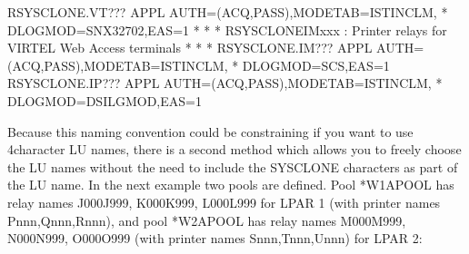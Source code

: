 \documentclass[letterpaper,10pt,english]{sphinxmanual}
\begin{document}
\begin{sphinxVerbatim}[commandchars=\\\{\}]
R\PYGZam{}SYSCLONE.VT??? APPL AUTH=(ACQ,PASS),MODETAB=ISTINCLM,               *
      DLOGMOD=SNX32702,EAS=1
* \PYGZhy{}\PYGZhy{}\PYGZhy{}\PYGZhy{}\PYGZhy{}\PYGZhy{}\PYGZhy{}\PYGZhy{}\PYGZhy{}\PYGZhy{}\PYGZhy{}\PYGZhy{}\PYGZhy{}\PYGZhy{}\PYGZhy{}\PYGZhy{}\PYGZhy{}\PYGZhy{}\PYGZhy{}\PYGZhy{}\PYGZhy{}\PYGZhy{}\PYGZhy{}\PYGZhy{}\PYGZhy{}\PYGZhy{}\PYGZhy{}\PYGZhy{}\PYGZhy{}\PYGZhy{}\PYGZhy{}\PYGZhy{}\PYGZhy{}\PYGZhy{}\PYGZhy{}\PYGZhy{}\PYGZhy{}\PYGZhy{}\PYGZhy{}\PYGZhy{}\PYGZhy{}\PYGZhy{}\PYGZhy{}\PYGZhy{}\PYGZhy{}\PYGZhy{}\PYGZhy{}\PYGZhy{}\PYGZhy{}\PYGZhy{}\PYGZhy{}\PYGZhy{}\PYGZhy{}\PYGZhy{}\PYGZhy{}\PYGZhy{}\PYGZhy{}\PYGZhy{}\PYGZhy{}\PYGZhy{}\PYGZhy{}\PYGZhy{}\PYGZhy{}\PYGZhy{}\PYGZhy{}\PYGZhy{} *
* R\PYGZam{}SYSCLONEIMxxx : Printer relays for VIRTEL Web Access terminals   *
* \PYGZhy{}\PYGZhy{}\PYGZhy{}\PYGZhy{}\PYGZhy{}\PYGZhy{}\PYGZhy{}\PYGZhy{}\PYGZhy{}\PYGZhy{}\PYGZhy{}\PYGZhy{}\PYGZhy{}\PYGZhy{}\PYGZhy{}\PYGZhy{}\PYGZhy{}\PYGZhy{}\PYGZhy{}\PYGZhy{}\PYGZhy{}\PYGZhy{}\PYGZhy{}\PYGZhy{}\PYGZhy{}\PYGZhy{}\PYGZhy{}\PYGZhy{}\PYGZhy{}\PYGZhy{}\PYGZhy{}\PYGZhy{}\PYGZhy{}\PYGZhy{}\PYGZhy{}\PYGZhy{}\PYGZhy{}\PYGZhy{}\PYGZhy{}\PYGZhy{}\PYGZhy{}\PYGZhy{}\PYGZhy{}\PYGZhy{}\PYGZhy{}\PYGZhy{}\PYGZhy{}\PYGZhy{}\PYGZhy{}\PYGZhy{}\PYGZhy{}\PYGZhy{}\PYGZhy{}\PYGZhy{}\PYGZhy{}\PYGZhy{}\PYGZhy{}\PYGZhy{}\PYGZhy{}\PYGZhy{}\PYGZhy{}\PYGZhy{}\PYGZhy{}\PYGZhy{}\PYGZhy{}\PYGZhy{} *
R\PYGZam{}SYSCLONE.IM??? APPL AUTH=(ACQ,PASS),MODETAB=ISTINCLM,               *
      DLOGMOD=SCS,EAS=1
R\PYGZam{}SYSCLONE.IP??? APPL AUTH=(ACQ,PASS),MODETAB=ISTINCLM,               *
      DLOGMOD=DSILGMOD,EAS=1
\end{sphinxVerbatim}

\sphinxAtStartPar
Because this naming convention could be constraining if you want to use 4\sphinxhyphen{}character LU names, there is a second method which allows you to freely choose the LU names without the need to include the SYSCLONE characters as part of the LU name. In the next example two pools are defined. Pool *W1APOOL has relay names J000\sphinxhyphen{}J999, K000\sphinxhyphen{}K999, L000\sphinxhyphen{}L999 for LPAR 1 (with printer names Pnnn,Qnnn,Rnnn), and pool *W2APOOL has relay names M000\sphinxhyphen{}M999, N000\sphinxhyphen{}N999, O000\sphinxhyphen{}O999 (with printer names Snnn,Tnnn,Unnn) for LPAR 2:\sphinxhyphen{}
\end{document}
